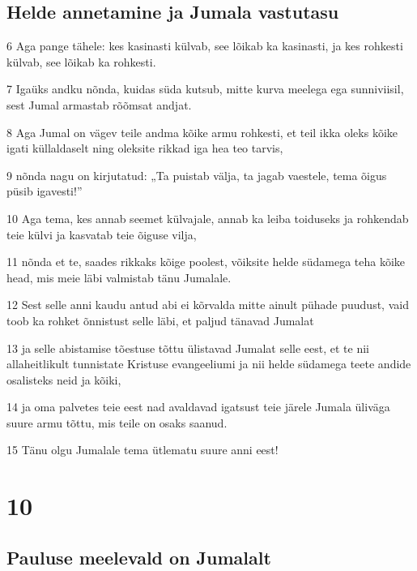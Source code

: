 \section*{Helde annetamine ja Jumala vastutasu}

\par 6 Aga pange tähele: kes kasinasti külvab, see lõikab ka kasinasti, ja kes rohkesti külvab, see lõikab ka rohkesti.
\par 7 Igaüks andku nõnda, kuidas süda kutsub, mitte kurva meelega ega sunniviisil, sest Jumal armastab rõõmsat andjat.
\par 8 Aga Jumal on vägev teile andma kõike armu rohkesti, et teil ikka oleks kõike igati küllaldaselt ning oleksite rikkad iga hea teo tarvis,
\par 9 nõnda nagu on kirjutatud: „Ta puistab välja, ta jagab vaestele, tema õigus püsib igavesti!”
\par 10 Aga tema, kes annab seemet külvajale, annab ka leiba toiduseks ja rohkendab teie külvi ja kasvatab teie õiguse vilja,
\par 11 nõnda et te, saades rikkaks kõige poolest, võiksite helde südamega teha kõike head, mis meie läbi valmistab tänu Jumalale.
\par 12 Sest selle anni kaudu antud abi ei kõrvalda mitte ainult pühade puudust, vaid toob ka rohket õnnistust selle läbi, et paljud tänavad Jumalat
\par 13 ja selle abistamise tõestuse tõttu ülistavad Jumalat selle eest, et te nii allaheitlikult tunnistate Kristuse evangeeliumi ja nii helde südamega teete andide osalisteks neid ja kõiki,
\par 14 ja oma palvetes teie eest nad avaldavad igatsust teie järele Jumala üliväga suure armu tõttu, mis teile on osaks saanud.
\par 15 Tänu olgu Jumalale tema ütlematu suure anni eest!


\chapter{10}

\section*{Pauluse meelevald on Jumalalt}

